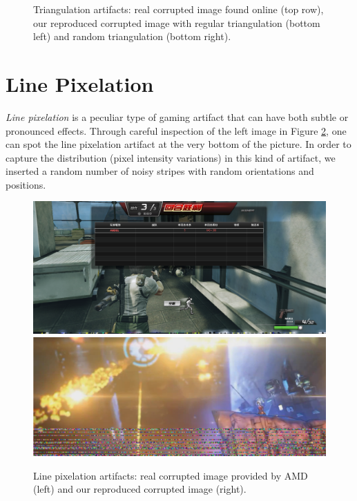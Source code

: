 \begin{figure}[!ht]
\vspace{5pt}
\caption[Triangulation artifacts]{Triangulation artifacts: real corrupted image found online (top row), our reproduced corrupted image with regular triangulation (bottom left) and random triangulation (bottom right).}
\label{fig:tri}
\end{figure}


\section*{Line Pixelation}
\textit{Line pixelation} is a peculiar type of gaming artifact that can have both subtle or pronounced effects. Through careful inspection of the left image in Figure \ref{fig:lp}, one can spot the line pixelation artifact at the very bottom of the picture. In order to capture the distribution (pixel intensity variations) in this kind of artifact, we inserted a random number of noisy stripes with random orientations and positions.

\begin{figure}[!ht]
\includegraphics[scale=0.143]{images/lp2.png}
\includegraphics[scale=.836]{images/lp1.png}
\vspace{5pt}
\caption[Line pixelation artifacts]{Line pixelation artifacts: real corrupted image provided by AMD (left) and our reproduced corrupted image (right).}
\label{fig:lp}
\end{figure}


